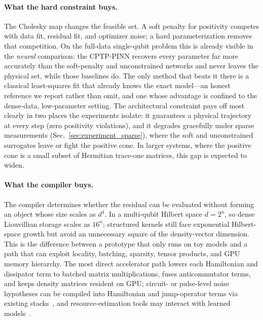 \documentclass[11pt]{article}
\begin{document}
\paragraph{What the hard constraint buys.}
The Cholesky map changes the feasible set. A soft penalty for positivity competes with data fit, residual fit, and optimizer noise; a hard parameterization removes that competition. On the full-data single-qubit problem this is already visible in the \emph{neural} comparison: the CPTP-PINN recovers every parameter far more accurately than the soft-penalty and unconstrained networks and never leaves the physical set, while those baselines do. The only method that beats it there is a classical least-squares fit that already knows the exact model---an honest reference we report rather than omit, and one whose advantage is confined to the dense-data, low-parameter setting. The architectural constraint pays off most clearly in two places the experiments isolate: it guarantees a physical trajectory at every step (zero positivity violations), and it degrades gracefully under sparse measurements (Sec.~\ref{sec:experiment_sparse}), where the soft and unconstrained surrogates leave or fight the positive cone. In larger systems, where the positive cone is a small subset of Hermitian trace-one matrices, this gap is expected to widen.

\paragraph{What the compiler buys.}
The compiler determines whether the residual can be evaluated without forming an object whose size scales as $d^4$. In a multi-qubit Hilbert space $d=2^n$, so dense Liouvillian storage scales as $16^n$; structured kernels still face exponential Hilbert-space growth but avoid an unnecessary square of the density-vector dimension. This is the difference between a prototype that only runs on toy models and a path that can exploit locality, batching, sparsity, tensor products, and GPU memory hierarchy. The most direct accelerator path lowers each Hamiltonian and dissipator term to batched matrix multiplications, fuses anticommutator terms, and keeps density matrices resident on GPU; circuit- or pulse-level noise hypotheses can be compiled into Hamiltonian and jump-operator terms via existing stacks~\cite{qiskit2024,qutip2024}, and resource-estimation tools may interact with learned models~\cite{beverland2022assessing,rall2023quantum}.
\end{document}

